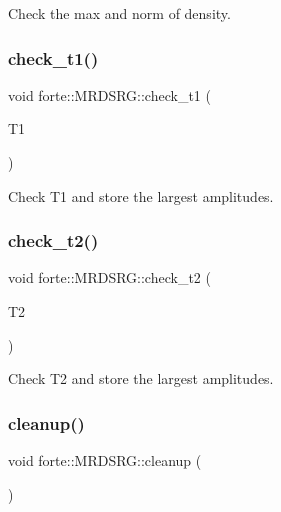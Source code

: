 Check the max and norm of density. 

\mbox{\label{classforte_1_1_m_r_d_s_r_g_a4328f68a1c79473817f1d70d7ac4616a}} 
\subsubsection{\texorpdfstring{check\+\_\+t1()}{check\_t1()}}
{\footnotesize\ttfamily void forte\+::\+M\+R\+D\+S\+R\+G\+::check\+\_\+t1 (\begin{DoxyParamCaption}\item[{Blocked\+Tensor \&}]{T1 }\end{DoxyParamCaption})\hspace{0.3cm}{\ttfamily [protected]}}



Check T1 and store the largest amplitudes. 

\mbox{\label{classforte_1_1_m_r_d_s_r_g_a8490e696406fe44dfe74e6a1cdf4d837}} 
\subsubsection{\texorpdfstring{check\+\_\+t2()}{check\_t2()}}
{\footnotesize\ttfamily void forte\+::\+M\+R\+D\+S\+R\+G\+::check\+\_\+t2 (\begin{DoxyParamCaption}\item[{Blocked\+Tensor \&}]{T2 }\end{DoxyParamCaption})\hspace{0.3cm}{\ttfamily [protected]}}



Check T2 and store the largest amplitudes. 

\mbox{\label{classforte_1_1_m_r_d_s_r_g_a42be8af22ccb44d3174c14cc0484a1fe}} 
\subsubsection{\texorpdfstring{cleanup()}{cleanup()}}
{\footnotesize\ttfamily void forte\+::\+M\+R\+D\+S\+R\+G\+::cleanup (\begin{DoxyParamCaption}{ }\end{DoxyParamCaption})\hspace{0.3cm}{\ttfamily [protected]}}



